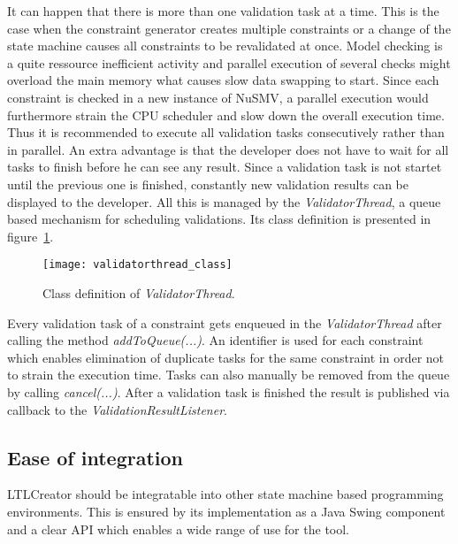 It can happen that there is more than one validation task at a time. This is the case when the constraint generator creates multiple constraints or a change of the state machine causes all constraints to be revalidated at once. Model checking is a quite ressource inefficient activity and parallel execution of several checks might overload the main memory what causes slow data swapping to start. Since each constraint is checked in a new instance of NuSMV, a parallel execution would furthermore strain the CPU scheduler and slow down the overall execution time. Thus it is recommended to execute all validation tasks consecutively rather than in parallel.
An extra advantage is that the developer does not have to wait for all tasks to finish before he can see any result. Since a validation task is not startet until the previous one is finished, constantly new validation results can be displayed to the developer.
All this is managed by the \emph{ValidatorThread}, a queue based mechanism for scheduling validations. Its class definition is presented in figure~\ref{fig:validatorthread_class}.
\begin{figure}[htbp]
  \centering
  \texttt{[image: validatorthread\_class]} 
  \caption{Class definition of \emph{ValidatorThread}.}
  \label{fig:validatorthread_class}
\end{figure}
Every validation task of a constraint gets enqueued in the \emph{ValidatorThread} after calling the method \emph{addToQueue(...)}.
An identifier is used for each constraint which enables elimination of duplicate tasks for the same constraint in order not to strain the execution time. Tasks can also manually be removed from the queue by calling \emph{cancel(...)}. After a validation task is finished the result is published via callback to the \emph{ValidationResultListener}.









\subsection{Ease of integration}
\label{sec:easeofintegration}

LTLCreator should be integratable into other state machine based programming environments. This is ensured by its implementation as a Java Swing component and a clear API which enables a wide range of use for the tool.

